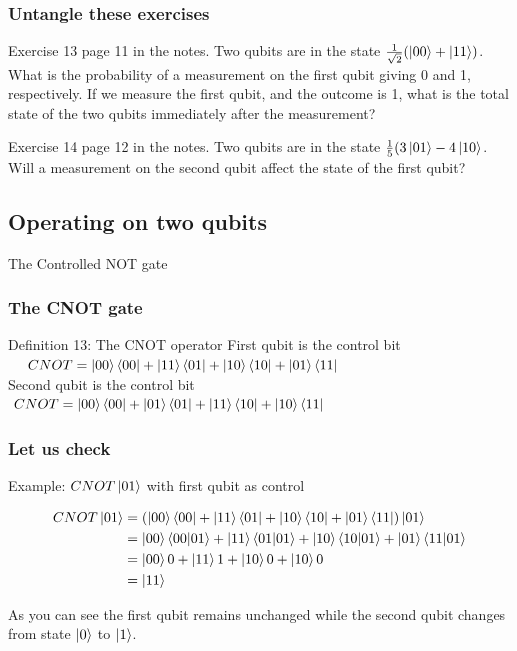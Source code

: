 \documentclass[10pt]{beamer}
\begin{document}
\begin{frame}
  \frametitle{Untangle these exercises}
  \begin{block}{Exercise 13 page 11 in the notes.}
    Two qubits are in the state $\frac{1}{\sqrt{2}}(\ket{00}+\ket{11})$. What is the probability of a measurement on the first qubit giving 0 and 1, respectively. If we measure the first qubit, and the outcome is 1, what is the total state of the two qubits immediately after the measurement?
  \end{block}
  \begin{block}{Exercise 14 page 12 in the notes.}
   Two qubits are in the state $\frac{1}{5}(3\ket{01}-4\ket{10}$. Will a measurement on the second qubit affect the state of the first qubit? 
  \end{block}
\end{frame}
\begin{frame}
  \section{Operating on two qubits}
  \centering
  The Controlled NOT gate
\end{frame}
\begin{frame}
  \frametitle{The CNOT gate}
  \begin{block}{Definition 13: The CNOT operator}
    First qubit is the control bit
 $  \ \ \ \ CNOT=\ket{00}\bra{00}+\ket{11}\bra{01}+\ket{10}\bra{10}+\ket{01}\bra{11}$
 \\ Second qubit is the control bit $ \ CNOT=\ket{00}\bra{00}+\ket{01}\bra{01}+\ket{11}\bra{10}+\ket{10}\bra{11}$
  \end{block}


\end{frame}
\begin{frame}
  \frametitle{Let us check}
  \begin{block}{Example: $CNOT\ket{01}$ with first qubit as control}
    
\begin{align*}
  CNOT \ket{01} &=\left( \ket{00}\bra{00}+\ket{11}\bra{01}+\ket{10}\bra{10}+\ket{01}\bra{11} \right) \ket{01} \\
                &= \ket{00}\braket{00|01}+\ket{11}\braket{01|01}+\ket{10}\braket{10|01}+\ket{01}\braket{11|01} \\
                &= \ket{00} 0 + \ket{11} 1 + \ket{10} 0 + \ket{10} 0 \\
  &= \ket{11}
\end{align*}
  \end{block}
  As you can see the first qubit remains unchanged while the second qubit changes from state $\ket{0}$ to $\ket{1}$.

\end{frame}
\end{document}
